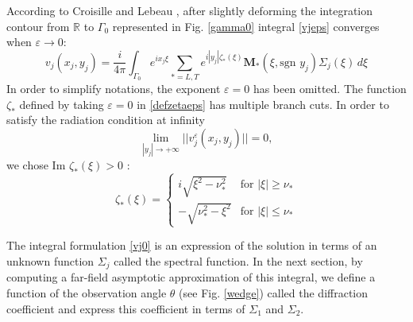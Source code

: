 According to Croisille and Lebeau \cite{CroisilleLebeau}, after slightly deforming the integration contour from $\mathbb{R}$ to $\Gamma_0$ represented in Fig. \ref{gamma0} integral \eqref{vjeps} converges when $\varepsilon \rightarrow 0$: 
\begin{equation}
v_j(x_j,y_j)=\frac{i}{4\pi}\int_{\Gamma_0} e^{ix_j\xi}\sum_{*=L,T}e^{i|y_j|\zeta_*(\xi)}\mathbf{M_*}(\xi,\mbox{sgn }y_j)\Sigma_j(\xi)\,d\xi
\label{vj0}
\end{equation}
In order to simplify notations, the exponent $\varepsilon=0$ has been omitted.
The function $\zeta_*$ defined by taking $\varepsilon=0$ in \eqref{defzetaeps} has multiple branch cuts. In order to satisfy the radiation condition at infinity
\begin{equation}
\lim\limits_{|y_j| \rightarrow +\infty} ||v_j^{\varepsilon}(x_j,y_j)||=0,
\label{CR}
\end{equation}
we chose Im $\zeta_*(\xi)>0$ :
\begin{equation}
\zeta_*(\xi)=
\left\{
\begin{matrix}
i\sqrt{\xi^2-\nu_*^2}& \mbox{for } |\xi| \geq \nu_* \\
-\sqrt{\nu_*^2-\xi^2}& \mbox{for } |\xi| \leq \nu_*
\end{matrix}
\right.
\label{C3:defzeta}
\end{equation}

The integral formulation \eqref{vj0} is an expression of the solution in terms of an unknown function $\Sigma_j$ called the spectral function. In the next section, by computing a far-field asymptotic approximation of this integral, we define a function of the observation angle $\theta$ (see Fig. \ref{wedge}) called the diffraction coefficient and express this coefficient in terms of $\Sigma_1$ and $\Sigma_2$.

